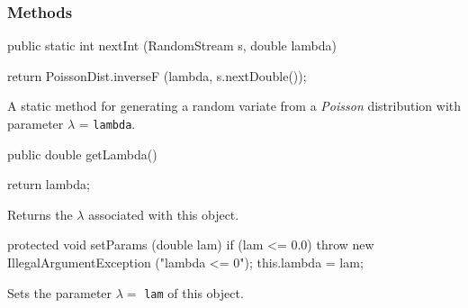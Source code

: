 \subsubsection* {Methods}
\begin{code}

   public static int nextInt (RandomStream s, double lambda) \begin{hide} {
      return PoissonDist.inverseF (lambda, s.nextDouble());
   }\end{hide}
\end{code}
 \begin{tabb}  
  A static method for generating a random variate from a 
  {\em Poisson\/} distribution with parameter $\lambda$ = \texttt{lambda}. 
 \end{tabb}
\begin{code}

   public double getLambda()\begin{hide} {
      return lambda;
   }
\end{hide}
\end{code}
\begin{tabb}
   Returns the $\lambda$ associated with this object.
\end{tabb}
\begin{hide}\begin{code}

   protected void setParams (double lam) {
      if (lam <= 0.0)
         throw new IllegalArgumentException ("lambda <= 0");
      this.lambda = lam;
   }
\end{code}
\begin{tabb} Sets the parameter $\lambda = $ \texttt{lam} of this object.
\end{tabb}
\begin{code}
}\end{code}
\end{hide}
